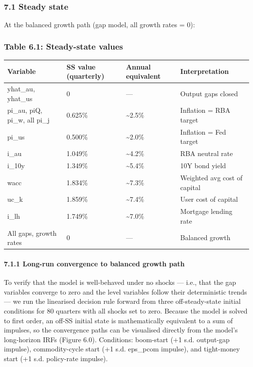 \documentclass[
]{article}
\newcounter{none} %
\begin{document}
\subsubsection{7.1 Steady state}\label{steady-state}

At the balanced growth path (gap model, all growth rates = 0):

\subsubsection{Table 6.1: Steady-state
values}\label{table-6.1-steady-state-values}

{\def\LTcaptype{none} %
\begin{longtable}[]{@{}llll@{}}
\toprule\noalign{}
Variable & SS value (quarterly) & Annual equivalent & Interpretation \\
\midrule\noalign{}
\endhead
\bottomrule\noalign{}
\endlastfoot
yhat\_au, yhat\_us & 0 & --- & Output gaps closed \\
pi\_au, piQ, pi\_w, all pi\_j & 0.625\% & \textasciitilde2.5\% &
Inflation = RBA target \\
pi\_us & 0.500\% & \textasciitilde2.0\% & Inflation = Fed target \\
i\_au & 1.049\% & \textasciitilde4.2\% & RBA neutral rate \\
i\_10y & 1.349\% & \textasciitilde5.4\% & 10Y bond yield \\
wacc & 1.834\% & \textasciitilde7.3\% & Weighted avg cost of capital \\
uc\_k & 1.859\% & \textasciitilde7.4\% & User cost of capital \\
i\_lh & 1.749\% & \textasciitilde7.0\% & Mortgage lending rate \\
All gaps, growth rates & 0 & --- & Balanced growth \\
\end{longtable}
}

\paragraph{7.1.1 Long-run convergence to balanced growth
path}\label{long-run-convergence-to-balanced-growth-path}

To verify that the model is well-behaved under no shocks --- i.e., that
the gap variables converge to zero and the level variables follow their
deterministic trends --- we run the linearised decision rule forward
from three off-steady-state initial conditions for 80 quarters with all
shocks set to zero. Because the model is solved to first order, an
off-SS initial state is mathematically equivalent to a sum of impulses,
so the convergence paths can be visualised directly from the model's
long-horizon IRFs (Figure 6.0). Conditions: boom-start (+1 s.d.
output-gap impulse), commodity-cycle start (+1 s.d. eps\_pcom impulse),
and tight-money start (+1 s.d. policy-rate impulse).
\end{document}

